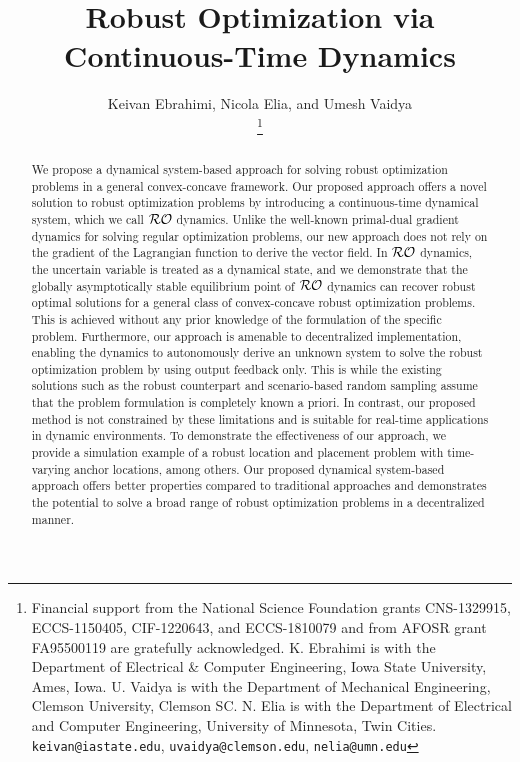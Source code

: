 \documentclass[journal,twoside,web]{ieeecolor}
\title{\LARGE \bf Robust Optimization via Continuous-Time Dynamics}
\author{Keivan Ebrahimi, Nicola Elia, and Umesh Vaidya\\
\thanks{Financial support from the National Science Foundation grants CNS-1329915, ECCS-1150405, CIF-1220643, and ECCS-1810079 and from AFOSR grant FA95500119 are gratefully acknowledged. K. Ebrahimi is with the Department of Electrical \& Computer Engineering, Iowa State University, Ames, Iowa. U. Vaidya is with the Department of Mechanical Engineering, Clemson University, Clemson SC.  N. Elia is with the Department of Electrical and Computer Engineering, University of Minnesota, Twin Cities.
{\tt\small keivan@iastate.edu},
{\tt\small uvaidya@clemson.edu},
{\tt\small nelia@umn.edu}
}}
\begin{document}

\pagestyle{headings}
\setcounter{page}{1}

\maketitle

\begin{abstract}
We propose a dynamical system-based approach for solving robust optimization problems in a general convex-concave framework. Our proposed approach offers a novel solution to robust optimization problems by introducing a continuous-time dynamical system, which we call ${\cal RO}$ dynamics. Unlike the well-known primal-dual gradient dynamics for solving regular optimization problems, our new approach does not rely on the gradient of the Lagrangian function to derive the vector field. In ${\cal RO}$ dynamics, the uncertain variable is treated as a dynamical state, and we demonstrate that the globally asymptotically stable equilibrium point of ${\cal RO}$ dynamics can recover robust optimal solutions for a general class of convex-concave robust optimization problems. This is achieved without any prior knowledge of the formulation of the specific problem. Furthermore, our approach is amenable to decentralized implementation, enabling the dynamics to autonomously derive an unknown system to solve the robust optimization problem by using output feedback only. This is while the existing solutions such as the robust counterpart and scenario-based random sampling assume that the problem formulation is completely known a priori. In contrast, our proposed method is not constrained by these limitations and is suitable for real-time applications in dynamic environments. To demonstrate the effectiveness of our approach, we provide a simulation example of a robust location and placement problem with time-varying anchor locations, among others. Our proposed dynamical system-based approach offers better properties compared to traditional approaches and demonstrates the potential to solve a broad range of robust optimization problems in a decentralized manner.
\end{abstract}
\end{document}
